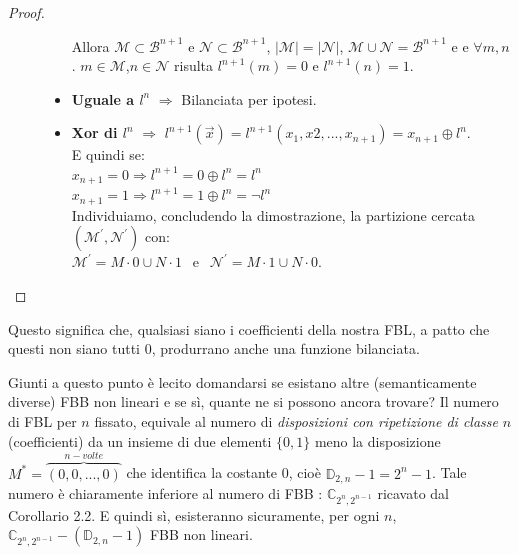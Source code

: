 \documentclass[12pt,a4paper,openright]{report}
\newcommand*\xor{\mathbin{\oplus}}
\begin{document}
\begin{proof}
\begin{description}
\begin{itemize}
                                                              Allora $\mathcal{M}\subset\mathcal{B}^{n+1}$ e $\mathcal{N}\subset\mathcal{B}^{n+1}$, ${\left\vert{\mathcal{M}}\right\vert} = {\left\vert{\mathcal{N}}\right\vert}$, $\mathcal{M} \cup \mathcal{N} = \mathcal{B}^{n+1}$ e
                                                              e $\forall m,n$. $m\in\mathcal{M}$,$n \in\mathcal{N}$ risulta $l^{n+1}(m) = 0$ e $ l^{n+1}(n) = 1$.
                                    \item \textbf{Uguale a $l^n$} $\Rightarrow$ Bilanciata per ipotesi. 
                                    \item \textbf{Xor di $l^n$} $\Rightarrow$ $l^{n+1}(\vec{x}) = l^{n+1}(x_1,x2,...,x_{n+1})= x_{n+1} \xor l^n$.
                                    \\ E quindi se:\\
                                    $x_{n+1} = 0 \Rightarrow l^{n+1} = 0 \xor l^n = l^n$ \\
                                    $x_{n+1} = 1 \Rightarrow l^{n+1} = 1 \xor l^n = \neg l^n$\\
                                    Individuiamo, concludendo la dimostrazione, la partizione cercata $(\mathcal{M^\prime},\mathcal{N^\prime})$ con:\\
                                    $\mathcal{M^\prime} = M\cdot0 \cup N\cdot1 \:\:$  e  $\:\: \mathcal{N^\prime} = M\cdot1 \cup N\cdot0$.
                                \end{itemize}
    \end{description}
\end{proof}
\noindent Questo significa che, qualsiasi siano i coefficienti della nostra FBL, a patto che questi non siano tutti $0$, produrrano anche una funzione bilanciata.\par

Giunti a questo punto è lecito domandarsi se esistano altre (semanticamente diverse) FBB  non lineari e se sì, quante ne si possono ancora trovare?
Il numero di FBL per $n$ fissato, equivale al numero di \textit{disposizioni con ripetizione di classe} $n$ (coefficienti) da un insieme di due elementi $\{0,1\}$ meno la disposizione $M^*=\overbrace{(0,0,...,0)}^{n-volte}$ che identifica la costante 0, cioè $\mathbb{D}_{2,n}-1= 2^n - 1$.
Tale numero è chiaramente inferiore al numero di FBB : $\mathbb{C}_{2^n,2^{n-1}}$ ricavato dal Corollario 2.2. E quindi sì, esisteranno sicuramente, per ogni $n$, $\mathbb{C}_{2^n,2^{n-1}} - (\mathbb{D}_{2,n} - 1)$ FBB non lineari.
\end{document}

